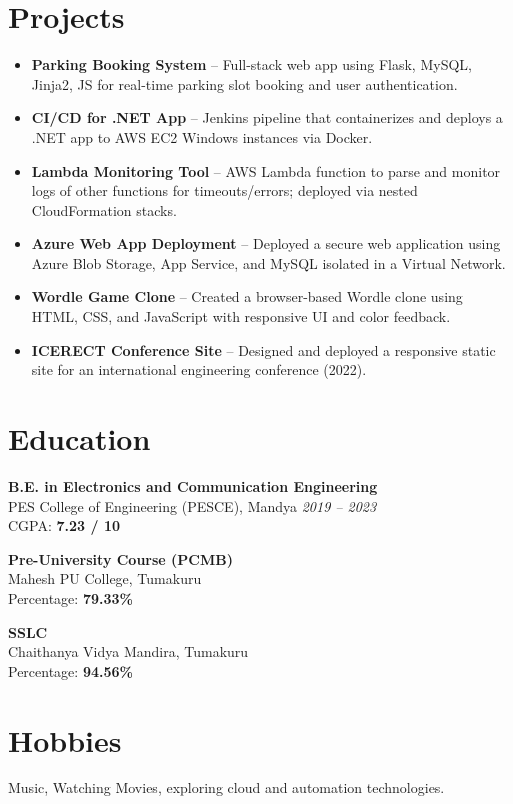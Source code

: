 \documentclass[a4paper,10pt]{article}
\begin{document}
\section*{Projects}
\begin{itemize}
    \item \textbf{Parking Booking System} – Full-stack web app using Flask, MySQL, Jinja2, JS for real-time parking slot booking and user authentication.
    \item \textbf{CI/CD for .NET App} – Jenkins pipeline that containerizes and deploys a .NET app to AWS EC2 Windows instances via Docker.
    \item \textbf{Lambda Monitoring Tool} – AWS Lambda function to parse and monitor logs of other functions for timeouts/errors; deployed via nested CloudFormation stacks.
    \item \textbf{Azure Web App Deployment} – Deployed a secure web application using Azure Blob Storage, App Service, and MySQL isolated in a Virtual Network.
    \item \textbf{Wordle Game Clone} – Created a browser-based Wordle clone using HTML, CSS, and JavaScript with responsive UI and color feedback.
    \item \textbf{ICERECT Conference Site} – Designed and deployed a responsive static site for an international engineering conference (2022).
\end{itemize}

\section*{Education}
\textbf{B.E. in Electronics and Communication Engineering} \\
PES College of Engineering (PESCE), Mandya \hfill \textit{2019 – 2023} \\
CGPA: \textbf{7.23 / 10}

\vspace{4pt}
\textbf{Pre-University Course (PCMB)} \\
Mahesh PU College, Tumakuru \\
Percentage: \textbf{79.33\%}

\vspace{4pt}
\textbf{SSLC} \\
Chaithanya Vidya Mandira, Tumakuru \\
Percentage: \textbf{94.56\%}

\section*{Hobbies}
Music, Watching Movies, exploring cloud and automation technologies.
\end{document}
